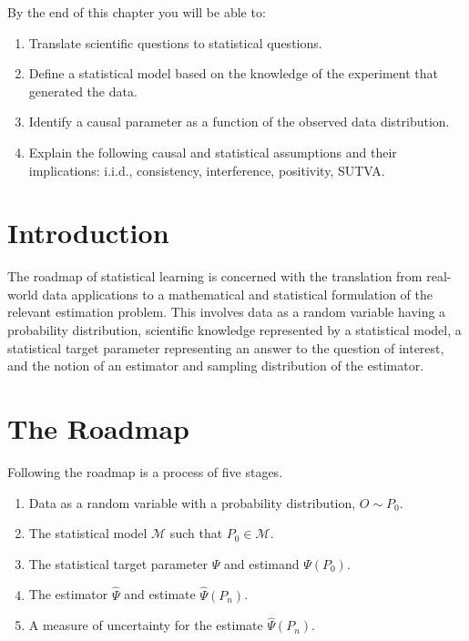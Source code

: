 \documentclass[
  12pt, krantz2,
]{book}
\providecommand{\tightlist}{%
  \setlength{\itemsep}{0pt}\setlength{\parskip}{0pt}}
\theoremstyle{definition}
\theoremstyle{definition}
\theoremstyle{definition}
\newcommand{\1}{\mathbbm{1}}
\begin{document}
By the end of this chapter you will be able to:

\begin{enumerate}
\def\labelenumi{\arabic{enumi}.}
\tightlist
\item
  Translate scientific questions to statistical questions.
\item
  Define a statistical model based on the knowledge of the experiment that
  generated the data.
\item
  Identify a causal parameter as a function of the observed data distribution.
\item
  Explain the following causal and statistical assumptions and their
  implications: i.i.d., consistency, interference, positivity, SUTVA.
\end{enumerate}

\hypertarget{introduction}{%
\section*{Introduction}\label{introduction}}


The roadmap of statistical learning is concerned with the translation from
real-world data applications to a mathematical and statistical formulation of
the relevant estimation problem. This involves data as a random variable having
a probability distribution, scientific knowledge represented by a statistical
model, a statistical target parameter representing an answer to the question of
interest, and the notion of an estimator and sampling distribution of the
estimator.

\hypertarget{roadmap}{%
\section{The Roadmap}\label{roadmap}}

Following the roadmap is a process of five stages.

\begin{enumerate}
\def\labelenumi{\arabic{enumi}.}
\tightlist
\item
  Data as a random variable with a probability distribution, \(O \sim P_0\).
\item
  The statistical model \(\mathcal{M}\) such that \(P_0 \in \mathcal{M}\).
\item
  The statistical target parameter \(\Psi\) and estimand \(\Psi(P_0)\).
\item
  The estimator \(\hat{\Psi}\) and estimate \(\hat{\Psi}(P_n)\).
\item
  A measure of uncertainty for the estimate \(\hat{\Psi}(P_n)\).
\end{enumerate}
\end{document}
